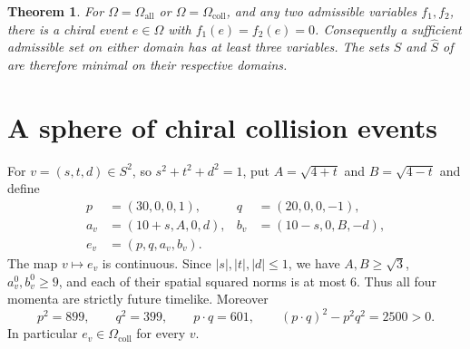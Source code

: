 \documentclass[11pt,a4paper]{article}
\newtheorem{theorem}{Theorem}
\newcommand{\all}{\Omega_{\mathrm{all}}}
\newcommand{\coll}{\Omega_{\mathrm{coll}}}
\begin{document}
\begin{theorem}\label{thm:main}
For $\Omega=\all$ or $\Omega=\coll$, and any two admissible variables
$f_1,f_2$, there is a chiral event $e\in\Omega$ with
$f_1(e)=f_2(e)=0$. Consequently a sufficient admissible set on either
domain has at least three variables. The sets $S$ and $\hat S$ of
\cite[\S5.1]{LHG} are therefore minimal on their respective domains.
\end{theorem}

\section{A sphere of chiral collision events}

For $v=(s,t,d)\in S^2$, so $s^2+t^2+d^2=1$, put
$A=\sqrt{4+t}$ and $B=\sqrt{4-t}$ and define
\begin{equation}\label{eq:family}
 \begin{aligned}
 p&=(30,0,0,1),& q&=(20,0,0,-1),\\
 a_v&=(10+s,A,0,d),& b_v&=(10-s,0,B,-d),\\
 e_v&=(p,q,a_v,b_v).
 \end{aligned}
\end{equation}
The map $v\mapsto e_v$ is continuous. Since $|s|,|t|,|d|\leq1$,
we have $A,B\geq\sqrt3$, $a_v^0,b_v^0\geq9$, and each of their
spatial squared norms is at most $6$. Thus all four momenta are
strictly future timelike. Moreover
\begin{equation}\label{eq:collision}
 p^2=899,\qquad q^2=399,\qquad p\cdot q=601,\qquad
 (p\cdot q)^2-p^2q^2=2500>0.
\end{equation}
In particular $e_v\in\coll$ for every $v$.
\end{document}
